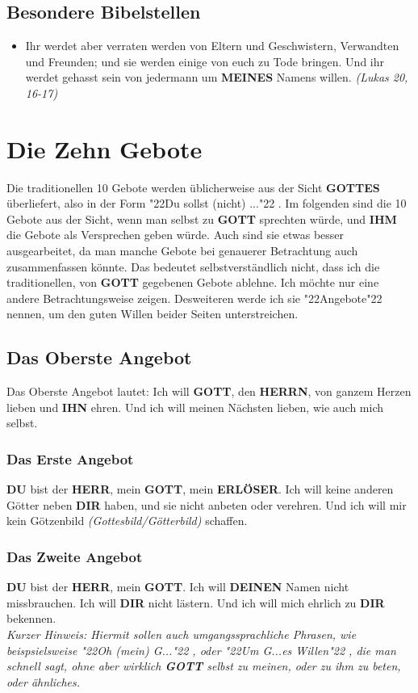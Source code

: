 \documentclass[10pt,a5paper]{article}
\newcommand{\Deinen}[0]{\textbf{DEINEN}}
\newcommand{\Dir}[0]{\textbf{DIR}}
\newcommand{\Du}[0]{\textbf{DU}}
\newcommand{\Erloeser}[0]{\textbf{ERL\"OSER}}
\newcommand{\Gottes}[0]{\textbf{GOTTES}}
\newcommand{\Gott}[0]{\textbf{GOTT}}
\newcommand{\Herrn}[0]{\textbf{HERRN}}
\newcommand{\Herr}[0]{\textbf{HERR}}
\newcommand{\Ihm}[0]{\textbf{IHM}}
\newcommand{\Ihn}[0]{\textbf{IHN}}
\newcommand{\Meines}[0]{\textbf{MEINES}}
\newcommand{\q}[1]{\char"22{#1}\char"22 }
\begin{document}
	\subsection{Besondere Bibelstellen}
		\begin{itemize}[nosep]
			\item	Ihr werdet aber verraten werden von Eltern und Geschwistern,
					Verwandten und Freunden;
					und sie werden einige von euch zu Tode bringen.
					Und ihr werdet gehasst sein von jedermann um {\Meines} Namens willen.
					\textit{(Lukas 20, 16-17)}
		\end{itemize}
		
	\newpage
	\section{Die Zehn Gebote}
		Die traditionellen 10 Gebote werden \"ublicherweise aus der Sicht {\Gottes} \"uberliefert,
		also in der Form \q{Du sollst (nicht) ...}.
		Im folgenden sind die 10 Gebote aus der Sicht,
		wenn man selbst zu {\Gott} sprechten w\"urde,
		und {\Ihm} die Gebote als Versprechen geben w\"urde.
		Auch sind sie etwas besser ausgearbeitet,
		da man manche Gebote bei genauerer Betrachtung auch zusammenfassen k\"onnte.
		Das bedeutet selbstverst\"andlich nicht,
		dass ich die traditionellen,
		von {\Gott} gegebenen Gebote ablehne.
		Ich m\"ochte nur eine andere Betrachtungsweise zeigen.
		Desweiteren werde ich sie \q{Angebote} nennen,
		um den guten Willen beider Seiten unterstreichen.
	
	\subsection{Das Oberste Angebot}
		Das Oberste Angebot lautet:
		Ich will {\Gott}, den {\Herrn}, von ganzem Herzen lieben und {\Ihn} ehren. Und ich will meinen N\"achsten lieben, wie auch mich selbst.
		
	\subsubsection{Das Erste Angebot}
		{\Du} bist der {\Herr},
		mein {\Gott},
		mein {\Erloeser}.
		Ich will keine anderen G\"otter neben {\Dir} haben,
		und sie nicht anbeten oder verehren.
		Und ich will mir kein G\"otzenbild
		\textit{(Gottesbild/G\"otterbild)}
		schaffen.
		
	\subsubsection{Das Zweite Angebot}
		{\Du} bist der {\Herr},
		mein {\Gott}.
		Ich will {\Deinen} Namen nicht missbrauchen.
		Ich will {\Dir} nicht l\"astern.
		Und ich will mich ehrlich zu {\Dir} bekennen.
		\\
		\textit{Kurzer Hinweis:
		Hiermit sollen auch umgangssprachliche Phrasen,
		wie beispsielsweise \q{Oh (mein) G...},
		oder \q{Um G...es Willen},
		die man schnell sagt,
		ohne aber wirklich {\Gott} selbst zu meinen,
		oder zu ihm zu beten,
		oder \"ahnliches.}
			
\end{document}
